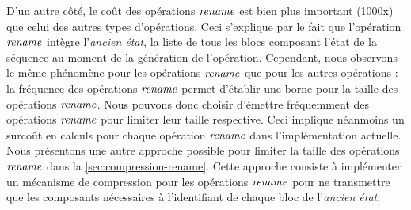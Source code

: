 D'un autre côté, le coût des opérations $\mathit{rename}$ est bien plus important (1000x) que celui des autres types d'opérations.
Ceci s'explique par le fait que l'opération $\mathit{rename}$ intègre l'\emph{ancien état}, \ie la liste de tous les blocs composant l'état de la séquence au moment de la génération de l'opération.
Cependant, nous observons le même phénomène pour les opérations $\mathit{rename}$ que pour les autres opérations : la fréquence des opérations $\mathit{rename}$ permet d'établir une borne pour la taille des opérations $\mathit{rename}$.
Nous pouvons donc choisir d'émettre fréquemment des opérations $\mathit{rename}$ pour limiter leur taille respective.
Ceci implique néanmoins un surcoût en calculs pour chaque opération $\mathit{rename}$ dans l'implémentation actuelle.
Nous présentons une autre approche possible pour limiter la taille des opérations $\mathit{rename}$ dans la \autoref{sec:compression-rename}.
Cette approche consiste à implémenter un mécanisme de compression pour les opérations $\mathit{rename}$ pour ne transmettre que les composants nécessaires à l'identifiant de chaque bloc de l'\emph{ancien état}.
